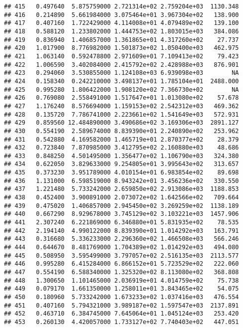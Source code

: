 \documentclass[
]{article}
\begin{document}
\begin{verbatim}
## 415   0.497640  5.875759000 2.721314e+02 2.759204e+03  1130.348
## 416   0.214890  5.661984000 3.075464e+01 3.967304e+02   138.900
## 417   0.407160  1.722429000 4.114008e+01 4.079489e+02   139.100
## 418   0.588120  1.233802000 1.444753e+02 1.803015e+03   384.086
## 419   0.836940  1.406857000 1.361865e+01 4.317260e+02    27.737
## 420   1.017900  8.776982000 1.501873e+02 1.050400e+03   462.975
## 421   1.063140  0.592478800 2.971609e+01 7.109413e+02    79.423
## 422   1.006590  3.402084000 2.415792e+02 2.428988e+03   876.901
## 423   0.294060  3.530855000 1.124108e+03 6.939098e+03        NA
## 424   0.158340  0.242210000 3.498137e+01 1.785104e+01  2488.000
## 425   0.995280  1.806422000 1.908120e+02 7.366730e+02        NA
## 426   0.769080  2.558491000 1.517647e+01 1.013080e+02    57.678
## 427   1.176240  8.576694000 1.159153e+02 2.542312e+03   469.362
## 428   0.135720  7.786741000 2.223661e+02 1.541649e+03   572.931
## 429   0.859560 12.484890000 3.490686e+02 3.169306e+03  2891.127
## 430   0.554190  2.589674000 8.839390e+01 2.240890e+02   253.962
## 431   0.542880  4.169582000 1.465719e+01 2.870377e+02    28.379
## 432   0.723840  7.870985000 3.412795e+02 2.160880e+03    48.686
## 433   0.848250  4.501495000 1.356477e+02 1.106790e+03   324.380
## 434   0.622050  3.829633000 9.254805e+01 3.995643e+02   313.657
## 435   0.373230  3.951789000 4.010154e+01 6.983854e+02    89.698
## 436   1.131000  6.598519000 8.943242e+01 3.456236e+02   330.550
## 437   1.221480  5.733242000 2.659850e+02 2.913086e+03  1188.853
## 438   0.452400  3.900891000 2.073072e+02 1.642566e+02   709.664
## 439   0.475020  1.406857000 2.945450e+02 3.269259e+02  1138.189
## 440   0.667290  8.929678000 3.745129e+02 3.103221e+03  1457.906
## 441   2.307240  6.221869000 6.346880e+01 5.831935e+02    78.535
## 442   2.194140  4.990122000 8.839390e+01 1.014292e+03   163.791
## 443   0.316680  5.336233000 2.296360e+02 1.466508e+03   566.246
## 444   0.644670  8.481769000 1.704389e+02 1.014292e+03   494.080
## 445   0.508950  3.595499000 3.797057e+02 2.516135e+03  2113.577
## 446   0.995280  6.415284000 6.866152e+01 5.723529e+02   222.060
## 447   0.554190  6.588340000 1.325320e+02 8.113080e+02   368.808
## 448   1.300650  1.101465000 2.036919e+01 4.014759e+02    75.738
## 449   0.079170  1.661350000 1.258011e+01 3.843465e+02    54.075
## 450   0.180960  5.733242000 1.673233e+02 1.037416e+03   476.554
## 451   0.407160  5.794321000 3.989187e+02 1.597547e+03  2137.891
## 452   0.463710  6.384745000 7.645064e+01 1.045124e+03   253.420
## 453   0.260130  4.420057000 1.733127e+02 7.740403e+02   447.051

\end{verbatim}
\end{document}
